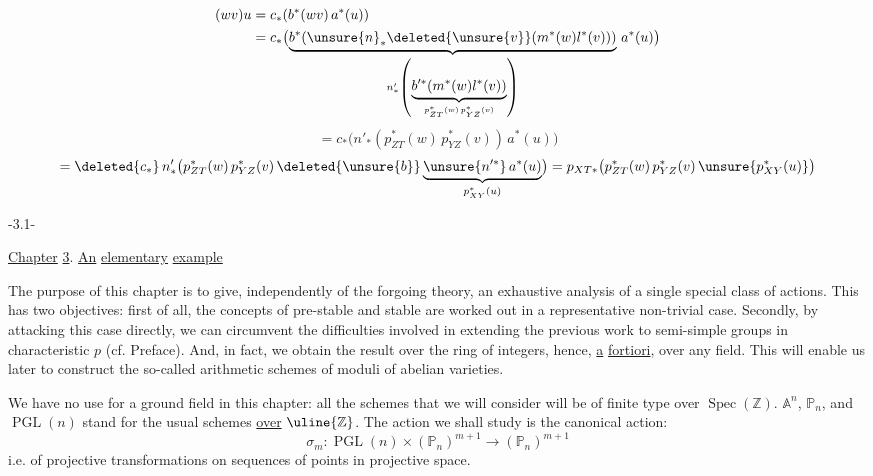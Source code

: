 \[
\begin{aligned}
(wv)u&=c_*(b^*(wv)\,a^*(u))\\
&=c_*\bigl(\underbrace{b^*(\unsure{n}_*\deleted{\unsure{v}}(m^*(w)l^*(v)))}_{n'_*\left(\underbrace{b'^*(m^*(w)l^*(v))}_{p_{ZT}^*(w)\,p_{YZ}^*(v)}\right)}\,a^*(u)\bigr)
\end{aligned}
\]
\[
=c_*\bigl(n'_*(p_{ZT}^*(w)\,p_{YZ}^*(v))\,a^*(u)\bigr)
\]
\[
=\deleted{c_*}\,n'_*\bigl(p_{ZT}^*(w)\,p_{YZ}^*(v)\,
\deleted{\unsure{b}}\underbrace{\unsure{n'^*}\,a^*(u)}_{p_{XY}^*(u)}\bigr)
=p_{XT*}\bigl(p_{ZT}^*(w)\,p_{YZ}^*(v)\,\unsure{p_{XY}^*(u)}\bigr)
\]
\begin{center}-3.1-\end{center}
\uline{Chapter} \uline{3}. \uline{An} \uline{elementary} \uline{example}

The purpose of this chapter is to give, independently of the
forgoing theory, an exhaustive analysis of a single special class of
actions. This has two objectives: first of all, the concepts of
pre-stable and stable are worked out in a representative non-trivial
case. Secondly, by attacking this case directly, we can circumvent
the difficulties involved in extending the previous work to semi-simple
groups in characteristic $p$ (cf. Preface). And, in fact, we obtain the
result over the ring of integers, hence, \uline{a} \uline{fortiori}, over any field.
This will enable us later to construct the so-called arithmetic
schemes of moduli of abelian varieties.

We have no use for a ground field in this chapter: all the
schemes that we will consider will be of finite type over $\operatorname{Spec}(\mathbb Z)$.
$\mathbb A^n$, $\mathbb P_n$, and $\operatorname{PGL}(n)$ stand for the usual schemes \uline{over} $\uline{\mathbb Z}$. The
action we shall study is the canonical action:
\[
\sigma_m:\operatorname{PGL}(n)\times(\mathbb P_n)^{m+1}\longrightarrow(\mathbb P_n)^{m+1}
\]
\margin{$-$}
i.e. of projective transformations on sequences of points in projective
space.

